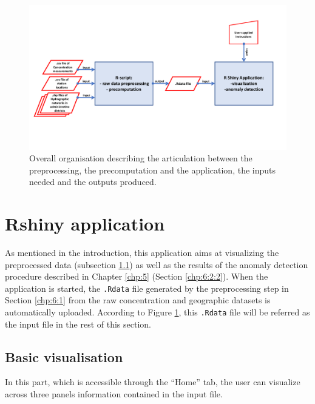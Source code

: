 \begin{figure}[htbp]
  \centering
  \includegraphics[angle = 90,scale = 0.65]{figs/Chap6/organigramme.pdf}
  \caption{Overall organisation describing the articulation between the preprocessing, the precomputation and the application, the inputs needed and the outputs produced.}
  \label{fig:orga}
\end{figure}

\section{Rshiny application}\label{chp:6:2}

As mentioned in the introduction, this application aims at visualizing the preprocessed data (subsection \ref{chp:6:2:1}) as well as the results of the anomaly detection procedure described in Chapter \ref{chp:5} (Section \ref{chp:6:2:2}). When the application is started, the \texttt{.Rdata} file generated by the preprocessing step in Section \ref{chp:6:1} from the raw concentration and geographic datasets is automatically uploaded. According to Figure \ref{fig:orga}, this \texttt{.Rdata} file will be referred as the input file in the rest of this section. 

\subsection{Basic visualisation}\label{chp:6:2:1}

  

In this part, which is accessible through the ``Home'' tab, the user can visualize across three panels information contained in the input file.

